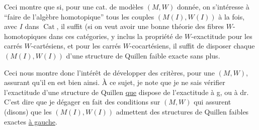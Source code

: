 Ceci montre que si, pour une cat. de modèles $(M,W)$ donnée, on s'intéresse à ``faire de l'algèbre homotopique''  tous les couples $(M(I),W(I))$ à la fois, avec $I$ dans $\operatorname{Cat}$, il suffit (si on veut avoir une bonne théorie des fibres  $W$-homotopiques dans ces catégories, y inclus la propriété de $W$-exactitude pour les carrés $W$-cartésiens, et pour les carrés $W$-cocartésiens, il suffit de disposer  chaque $(M(I),W(I))$ d'une structure de Quillen faible exacte sans plus.

Ceci nous montre donc l'intérêt de développer des critères, pour une $(M,W)$, assurant qu'il en est bien ainsi. À ce sujet, je note que je ne sais  vérifier l'exactitude d'une structure de Quillen \uline{que}   dispose de l'exactitude à g, ou à dr. C'est dire que je  dégager en fait des conditions sur $(M,W)$ qui assurent (disons) que les $(M(I),W(I))$ admettent des structures de Quillen faibles exactes \uline{à gauche}.
